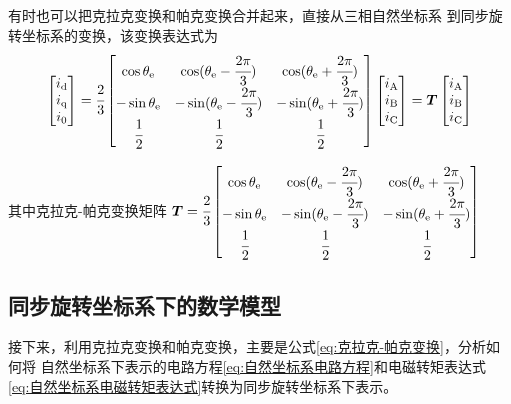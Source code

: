 有时也可以把克拉克变换和帕克变换合并起来，直接从三相自然坐标系
到同步旋转坐标系的变换，该变换表达式为
\begin{equation}
    \begin{bmatrix}
        i_{\mathrm{d}}\\i_{\mathrm{q}}\\i_{\mathrm{0}}
    \end{bmatrix}
    =
    \cfrac 23
    \begin{bmatrix}
        \cos\theta_{\mathrm{e}}&\cos(\theta_{\mathrm{e}}-\cfrac{2\pi}{3})
        &\cos(\theta_{\mathrm{e}}+\cfrac{2\pi}{3})
        \\-\sin\theta_{\mathrm{e}}&-\sin(\theta_{\mathrm{e}}-\cfrac{2\pi}{3})
        &-\sin(\theta_{\mathrm{e}}+\cfrac{2\pi}{3})\\
        \cfrac 12&\cfrac 12&\cfrac 12
    \end{bmatrix}
    \begin{bmatrix}i_{\mathrm{A}}\\i_{\mathrm{B}}\\i_{\mathrm{C}}\end{bmatrix}
    =\bm{T}\begin{bmatrix}i_{\mathrm{A}}\\i_{\mathrm{B}}\\i_{\mathrm{C}}\end{bmatrix}
    \label{eq:克拉克-帕克变换}
\end{equation}

其中克拉克-帕克变换矩阵
\(\bm{T}=\cfrac 23
\begin{bmatrix}
    \cos\theta_{\mathrm{e}}&\cos(\theta_{\mathrm{e}}-\cfrac{2\pi}{3})
    &\cos(\theta_{\mathrm{e}}+\cfrac{2\pi}{3})\\
    -\sin\theta_{\mathrm{e}}&-\sin(\theta_{\mathrm{e}}-\cfrac{2\pi}{3})
    &-\sin(\theta_{\mathrm{e}}+\cfrac{2\pi}{3})\\
    \cfrac 12&\cfrac 12&\cfrac 12
\end{bmatrix}\)

\subsection{同步旋转坐标系下的数学模型}

接下来，利用克拉克变换和帕克变换，主要是公式\eqref{eq:克拉克-帕克变换}，分析如何将
自然坐标系下表示的电路方程\eqref{eq:自然坐标系电路方程}和电磁转矩表达式
\eqref{eq:自然坐标系电磁转矩表达式}转换为同步旋转坐标系下表示。

